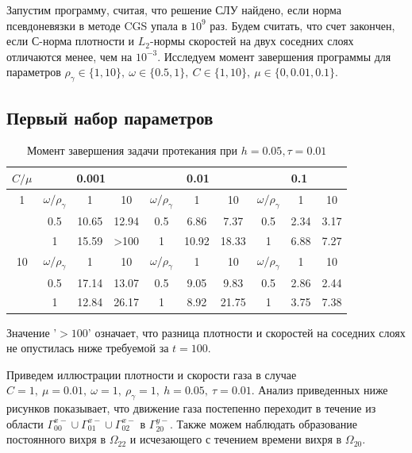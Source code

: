 \documentclass[specialist,subf,href,colorlinks=true,12pt
,times,mtpro,specialist
]{disser}
\begin{document}
Запустим программу, считая, что решение СЛУ найдено, если норма псевдоневязки в методе CGS упала в $10^9$ раз. Будем считать, что счет закончен, если С-норма плотности и $L_2$-нормы скоростей на двух соседних слоях отличаются менее, чем на $10^{-3}$. Исследуем момент завершения программы для параметров $\rho_\gamma \in \{1, 10\},\ \omega \in \{0.5, 1\},\ C \in \{1, 10\},\ \mu \in \{0, 0.01, 0.1\}$. 

\subsection {Первый набор параметров}

\begin{table}[H]
\caption{Момент завершения задачи протекания при $h = 0.05, \tau = 0.01$}
\begin{center}
\begin{tabular}{|c|c|c|c|c|c|c|c|c|c|}
\hline
$C / \mu$ & \multicolumn{3}{c|}{0.001} & \multicolumn{3}{c|}{0.01} & \multicolumn{3}{c|}{0.1} \\
\hline
1 & $\omega / \rho_\gamma$ & 1 & 10 & $\omega / \rho_\gamma$ & 1 & 10 & $\omega / \rho_\gamma$ & 1 & 10  \\
\cline{2-10}
  & 0.5 & 10.65 & 12.94 & 0.5 & 6.86 & 7.37 & 0.5 & 2.34 & 3.17  \\
\cline{2-10}
  & 1 & 15.59 & >100 & 1 & 10.92 & 18.33 & 1 & 6.88 & 7.27   \\
\hline
10 & $\omega / \rho_\gamma$ & 1 & 10 & $\omega / \rho_\gamma$ & 1 & 10 & $\omega / \rho_\gamma$ & 1 & 10  \\
\cline{2-10}
  & 0.5 & 17.14 & 13.07 & 0.5 & 9.05 & 9.83 & 0.5 & 2.86 & 2.44  \\
\cline{2-10}
  & 1 & 12.84 & 26.17 & 1 & 8.92 & 21.75 & 1 & 3.75 & 7.38  \\
\hline
\end{tabular}
\end{center}
\end{table}

Значение '$>100$' означает, что разница плотности и скоростей на соседних слоях не опустилась ниже требуемой за $t = 100$.

Приведем иллюстрации плотности и скорости газа в случае $C = 1,\ \mu = 0.01,\ \omega = 1,\ \rho_\gamma = 1,\ h = 0.05,\ \tau = 0.01$. Анализ приведенных ниже рисунков показывает, что движение газа постепенно переходит в течение из области $\Gamma_{00}^{x-} \cup \Gamma_{01}^{x-} \cup \Gamma_{02}^{x-}$ в $\Gamma_{20}^{y-}$. Также можем наблюдать образование постоянного вихря в $\Omega_{22}$ и исчезающего с течением времени вихря в $\Omega_{20}$.
\end{document}
